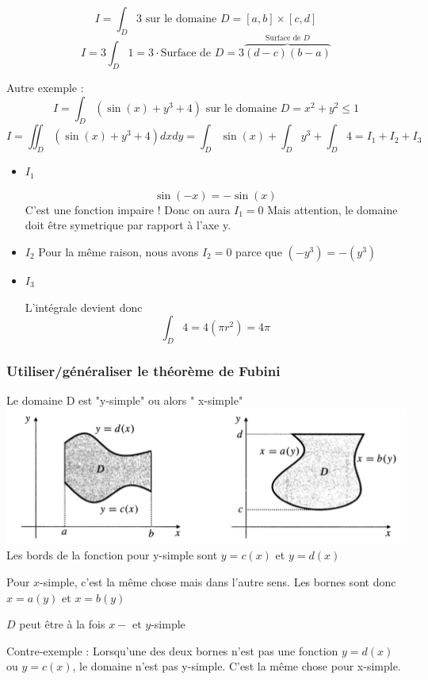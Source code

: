 \[I=\int_D 3 \text{ sur le domaine }D=[a,b]\times[c,d]\]
\[I=3\int_D 1 = 3 \cdot \text{Surface de }D = 3\overbrace{(d-c)(b-a)}^{\text{Surface de }D} \]

Autre exemple :
\[I = \int_D ( \sin(x) +y^3 + 4 )\text{ sur le domaine } D=x^2+y^2\le 1\]
\[I = \iint_D(\sin(x)+y^3+4)dxdy = \int_D \sin(x) + \int_D y^3 + \int_D 4 = I_1 + I_2 + I_3\]
\begin{itemize}

\item \textbf{$I_1$}




\[\sin(-x) = -\sin(x) \]
C'est une fonction impaire !
Donc on aura \emph{$I_1=0$}
Mais attention, le domaine doit être symetrique par rapport à l'axe y.
\item \textbf{$I_2$}
Pour la même raison, nous avons $I_2=0$ parce que $(-y^3) = -(y^3)$

\item \textbf{$I_3$}

L'intégrale devient donc
\[\int_D 4 = 4(\pi r^2) = 4\pi \]

\end{itemize}
\subsubsection{Utiliser/généraliser le théorème de Fubini}

Le domaine D est "y-simple" ou alors " x-simple"\\
\includegraphics[scale=0.7]{image2.png}
\\
Les bords de la fonction pour y-simple sont $y=c(x)$ et $y=d(x)$

Pour $x$-simple, c'est la même chose mais dans l'autre sens. Les bornes sont donc $x=a(y)$ et $x=b(y)$
\begin{myrem}
$D$ peut être à la fois $x-$ et $y$-simple
\end{myrem}
\begin{myrem}
Contre-exemple : Lorsqu'une des deux bornes n'est pas une fonction $y=d(x)$ ou $y=c(x)$, le domaine n'est pas y-simple. C'est la même chose pour x-simple.

\end{myrem}

